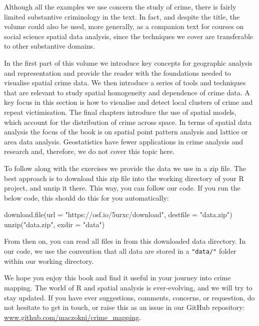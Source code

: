 \documentclass[
]{book}
\newenvironment{Shaded}{\begin{snugshade}}{\end{snugshade}}
\newcommand{\AttributeTok}[1]{\textcolor[rgb]{0.77,0.63,0.00}{#1}}
\newcommand{\FunctionTok}[1]{\textcolor[rgb]{0.00,0.00,0.00}{#1}}
\newcommand{\NormalTok}[1]{#1}
\newcommand{\StringTok}[1]{\textcolor[rgb]{0.31,0.60,0.02}{#1}}
\begin{document}
Although all the examples we use concern the study of crime, there is fairly limited substantive criminology in the text. In fact, and despite the title, the volume could also be used, more generally, as a companion text for courses on social science spatial data analysis, since the techniques we cover are transferable to other substantive domains.

In the first part of this volume we introduce key concepts for geographic analysis and representation and provide the reader with the foundations needed to visualise spatial crime data. We then introduce a series of tools and techniques that are relevant to study spatial homogeneity and dependence of crime data. A key focus in this section is how to visualise and detect local clusters of crime and repeat victimisation. The final chapters introduce the use of spatial models, which account for the distribution of crime across space. In terms of spatial data analysis the focus of the book is on spatial point pattern analysis and lattice or area data analysis. Geostatistics have fewer applications in crime analysis and research and, therefore, we do not cover this topic here.

To follow along with the exercises we provide the data we use in a zip file. The best approach is to download this zip file into the working directory of your R project, and unzip it there. This way, you can follow our code. If you run the below code, this should do this for you automatically:

\begin{Shaded}
\begin{Highlighting}[]
\FunctionTok{download.file}\NormalTok{(}\AttributeTok{url =} \StringTok{"https://osf.io/5urxc/download"}\NormalTok{, }\AttributeTok{destfile =} \StringTok{"data.zip"}\NormalTok{)}
\FunctionTok{unzip}\NormalTok{(}\StringTok{"data.zip"}\NormalTok{, }\AttributeTok{exdir =} \StringTok{"data"}\NormalTok{)}
\end{Highlighting}
\end{Shaded}

From then on, you can read all files in from this downloaded data directory. In our code, we use the convention that all data are stored in a \texttt{"data/"} folder within our working directory.

We hope you enjoy this book and find it useful in your journey into crime mapping. The world of R and spatial analysis is ever-evolving, and we will try to stay updated. If you have ever suggestions, comments, concerns, or requestion, do not hesitate to get in touch, or raise this as an issue in our GitHub repository: \href{https://github.com/maczokni/crime_mapping}{www.github.com/maczokni/crime\_mapping}.
\end{document}
